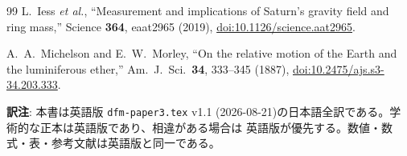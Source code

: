 \documentclass[a4paper,10pt,twocolumn]{ltjsarticle}
\begin{document}
\begin{thebibliography}{99}
L.~Iess \emph{et al.}, ``Measurement and implications of Saturn's
gravity field and ring mass,'' Science \textbf{364}, eaat2965 (2019),
\href{https://doi.org/10.1126/science.aat2965}
{doi:10.1126/science.aat2965}.

A.~A.~Michelson and E.~W.~Morley, ``On the relative motion of the
Earth and the luminiferous ether,''
Am.\ J.\ Sci.\ \textbf{34}, 333--345 (1887),
\href{https://doi.org/10.2475/ajs.s3-34.203.333}
{doi:10.2475/ajs.s3-34.203.333}.

\end{thebibliography}

\vspace{1em}
\noindent\textbf{訳注}: 本書は英語版 \texttt{dfm-paper3.tex} v1.1
(2026-08-21)の日本語全訳である。学術的な正本は英語版であり、相違がある場合は
英語版が優先する。数値・数式・表・参考文献は英語版と同一である。
\end{document}
